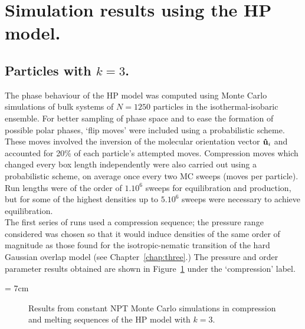 
\section{Simulation results using the HP model.}
\label{s:HPresults}

\subsection{Particles with $k=3$.}

The phase behaviour of the HP model was computed using Monte Carlo simulations of bulk systems 
of $N=1250$ particles in the isothermal-isobaric ensemble. For better sampling of phase space 
and to ease the formation of possible polar phases, `flip moves' were included using a probabilistic
scheme. These moves involved the inversion of the molecular orientation vector $\mathbf{\hat{u} }_i$ and 
accounted for 20\% of each particle's attempted moves. Compression moves which changed every
box length independently were also carried out using a  probabilistic scheme, on average once 
every two MC sweeps (\ie moves per particle). 
Run lengths were of the order of $1.10^6$ sweeps for equilibration and production, but for 
some of the highest densities up to $5.10^6$ sweeps were necessary to achieve
equilibration.\\

The first series of runs used a compression sequence; the pressure range considered was chosen so that 
it would induce densities of the same order of magnitude as those found for the
isotropic-nematic transition of the hard Gaussian overlap model (see Chapter~\ref{chap:three}.)
The pressure and order parameter results obtained are shown in 
Figure~\ref{fig:HP_k3_phaseDia} under the `compression' label.

\picW = 7cm
\begin{figure}
	\caption{Results from constant NPT Monte Carlo simulations in compression and melting
	sequences of the HP model with $k=3$.}
	\label{fig:HP_k3_phaseDia}
\end{figure}

